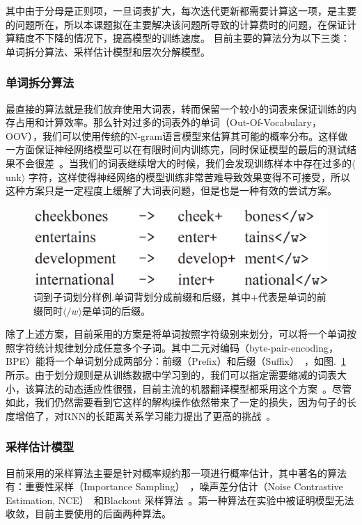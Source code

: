 \documentclass[master,openright,twoside,color]{buaathesis}
\begin{document}
其中由于分母是正则项，一旦词表扩大，每次迭代更新都需要计算这一项，是主要的问题所在，所以本课题拟在主要解决该问题所导致的计算费时的问题，在保证计算精度不下降的情况下，提高模型的训练速度。 目前主要的算法分为以下三类： 单词拆分算法、采样估计模型和层次分解模型。


\subsubsection{单词拆分算法}
最直接的算法就是我们放弃使用大词表，转而保留一个较小的词表来保证训练的内存占用和计算效率。那么针对过多的词表外的单词（Out-Of-Vocabulary，OOV），我们可以使用传统的N-gram语言模型来估算其可能的概率分布。这样做一方面保证神经网络模型可以在有限时间内训练完，同时保证模型的最后的测试结果不会很差~\cite{DBLP:journals/csl/Schwenk07}。当我们的词表继续增大的时候，我们会发现训练样本中存在过多的$\langle$unk$\rangle$ 字符，这样使得神经网络的模型训练非常苦难导致效果变得不可接受，所以这种方案只是一定程度上缓解了大词表问题，但是也是一种有效的尝试方案。

\begin{figure}
  \centering
\includegraphics[width=0.6\linewidth]{./figures/subword.png}
\caption{词到子词划分样例.单词背划分成前缀和后缀，其中$+$代表是单词的前缀同时$\langle /w \rangle$是单词的后缀。}\label{fig:subword}
\end{figure}
除了上述方案，目前采用的方案是将单词按照字符级别来划分，可以将一个单词按照字符统计规律划分成任意多个子词。其中二元对编码（byte-pair-encoding，BPE）能将一个单词划分成两部分：前缀（Prefix）和后缀（Suffix）~\cite{DBLP:conf/icassp/Tucker0P94, DBLP:conf/acl/SennrichHB16a,Gage:1994:NAD:177910.177914}，如图.~\ref{fig:subword} 所示。由于划分规则是从训练数据中学习到的，我们可以指定需要缩减的词表大小，该算法的动态适应性很强，目前主流的机器翻译模型都采用这个方案~\cite{DBLP:journals/corr/JozefowiczVSSW16}。尽管如此，我们仍然需要看到它这样的解构操作依然带来了一定的损失，因为句子的长度增倍了，对RNN的长距离关系学习能力提出了更高的挑战~\cite{DBLP:conf/aaai/KimJSR16}。

\subsubsection{采样估计模型}
目前采用的采样算法主要是针对概率规约那一项进行概率估计，其中著名的算法有：重要性采样（Importance Sampling）~\cite{DBLP:journals/tnn/BengioS08}，噪声差分估计（Noise Contrastive Estimation, NCE）~\cite{DBLP:conf/icml/MnihT12}和Blackout 采样算法~\cite{DBLP:journals/iclr/JiVSAD15}。第一种算法在实验中被证明模型无法收敛，目前主要使用的后面两种算法。
\end{document}
